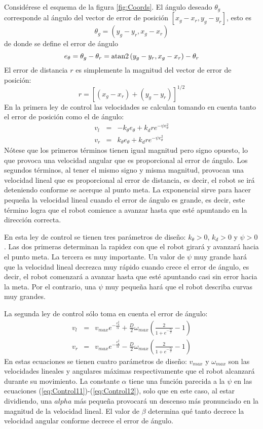 Considérese el esquema de la figura \ref{fig:Coords}. El ángulo deseado $\theta_g$ corresponde al ángulo del vector de error de posición $\left[x_g - x_r, y_g - y_r\right]$, esto es
\[ \theta_g =  \left(y_g - y_r, x_g - x_r\right)\]
de donde se define el error de ángulo
\[e_{\theta} = \theta_g - \theta_r = \operatorname{atan2}\left(y_g - y_r, x_g - x_r\right) - \theta_r\]
El error de distancia $r$ es simplemente la magnitud del vector de error de posición:
\[r= \left[\left(x_g - x_r\right) + \left(y_g - y_r\right)\right]^{1/2}\]
En la primera ley de control las velocidades se calculan tomando en cuenta tanto el error de posición como el de ángulo:
\begin{eqnarray}
v_{l} &=& -k_{\theta}e_{\theta} + k_d r e^{-\psi e_{\theta}^2}\label{eq:Control11}\\
v_{r} &=&  k_{\theta}e_{\theta} + k_d r e^{-\psi e_{\theta}^2}\label{eq:Control12}
\end{eqnarray}
Nótese que los primeros términos tienen igual magnitud pero signo opuesto, lo que provoca una velocidad angular que es proporcional al error de ángulo. Los segundos términos, al tener el mismo signo y misma magnitud, provocan una velocidad lineal que es proporcional al error de distancia, es decir, el robot se irá deteniendo conforme se acerque al punto meta. La exponencial sirve para hacer pequeña la velocidad lineal cuando el error de ángulo es grande, es decir, este término logra que el robot comience a avanzar hasta que esté apuntando en la dirección correcta.

En esta ley de control se tienen tres parámetros de diseño: $k_{\theta}>0$, $k_d>0$ y $\psi>0$. Las dos primeras determinan la rapidez con que el robot girará y avanzará hacia el punto meta. La tercera es muy importante. Un valor de $\psi$ muy grande hará que la velocidad lineal decrezca muy rápido cuando crece el error de ángulo, es decir, el robot comenzará a avanzar hasta que esté apuntando casi sin error hacia la meta. Por el contrario, una $\psi$ muy pequeña hará que el robot describa curvas muy grandes.  

La segunda ley de control sólo toma en cuenta el error de ángulo:
\begin{eqnarray} 
v_{l} &=& v_{max}e^{-\frac{e_{\theta}^{2}}{\alpha}} + 
\frac{D}{2}\omega_{max}\left(\frac{2}{1+e^{-\frac{e_{\theta}}{\beta}}}-1\right)\label{eq:Control21}\\
v_{r} &=& v_{max}e^{-\frac{e_{\theta}^{2}}{\alpha}} -
\frac{D}{2}\omega_{max}\left(\frac{2}{1+e^{-\frac{e_{\theta}}{\beta}}}-1\right)\label{eq:Control22}
\end{eqnarray}
En estas ecuaciones se tienen cuatro parámetros de diseño: $v_{max}$ y $\omega_{max}$ son las velocidades lineales y angulares máximas respectivamente que el robot alcanzará durante su movimiento. La constante $\alpha$ tiene una función parecida a la $\psi$ en las ecuaciones (\ref{eq:Control11})-(\ref{eq:Control12}), solo que en este caso, al estar dividiendo, una $alpha$ más pequeña provocará un descenso más pronunciado en la magnitud de la velocidad lineal. El valor de $\beta$ determina qué tanto decrece la velocidad angular conforme decrece el error de ángulo. 


